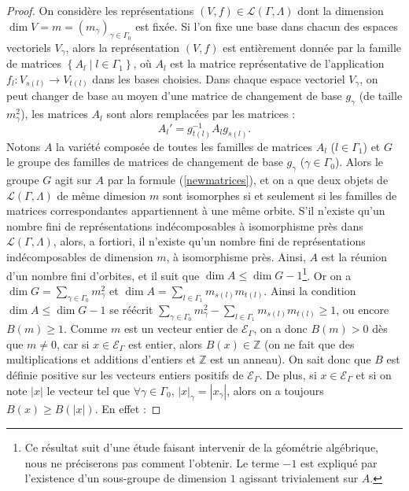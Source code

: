 \documentclass[a4paper,11pt]{article}
\newcommand{\EG}{\mathscr{E}_\Gamma}
\begin{document}
\begin{proof}
	On considère les représentations $(V,f)\in\mathscr L(\Gamma,\Lambda)$ dont la dimension $\dim V=m=(m_\gamma)_{\gamma\in\Gamma_0}$ est fixée. Si l'on fixe une base dans chacun des espaces vectoriels $V_\gamma$, alors la représentation $(V,f)$ est entièrement donnée par la famille de matrices $\left\{ A_l \;|\; l\in\Gamma_1 \right\}$, où $A_l$ est la matrice représentative de l'application $f_l:V_{s(l)}\rightarrow V_{t(l)}$ dans les bases choisies. Dans chaque espace vectoriel $V_\gamma$, on peut changer de base au moyen d'une matrice de changement de base $g_\gamma$ (de taille $m_\gamma^2$), les matrices $A_l$ sont alors remplacées par les matrices :
	\begin{equation}
		A_l'=g_{t(l)}^{-1}A_lg_{s(l)}.
		\label{newmatrices}
	\end{equation}
	Notons $A$ la variété composée de toutes les familles de matrices $A_l$ ($l\in\Gamma_1$) et $G$ le groupe des familles de matrices de changement de base $g_\gamma$ ($\gamma\in\Gamma_0$). Alors le groupe $G$ agit sur $A$ par la formule (\ref{newmatrices}), et on a que deux objets de $\mathscr L(\Gamma,\Lambda)$ de même dimesion $m$ sont isomorphes si et seulement si les familles de matrices correspondantes appartiennent à une même orbite. S'il n'existe qu'un nombre fini de représentations indécomposables à isomorphisme près dans $\mathscr L(\Gamma,\Lambda)$, alors, a fortiori, il n'existe qu'un nombre fini de représentations indécomposables de dimension $m$, à isomorphisme près. Ainsi, $A$ est la réunion d'un nombre fini d'orbites, et il suit que $\dim A\leq\dim G-1$\footnote{Ce résultat suit d'une étude faisant intervenir de la géométrie algébrique, nous ne préciserons pas comment l'obtenir. Le terme $-1$ est expliqué par l'existence d'un sous-groupe de dimension $1$ agissant trivialement sur $A$.}. Or on a $\dim G=\sum_{\gamma\in\Gamma_0}m_\gamma^2$ et $\dim A=\sum_{l\in\Gamma_1}m_{s(l)}m_{t(l)}$. Ainsi la condition $\dim A\leq\dim G-1$ se réécrit $\sum_{\gamma\in\Gamma_0}m_\gamma^2-\sum_{l\in\Gamma_1}m_{s(l)}m_{t(l)}\geq 1$, ou encore $B(m)\geq1$. Comme $m$ est un vecteur entier de $\EG$, on a donc $B(m)>0$ dès que $m\neq0$, car si $x\in\EG$ est entier, alors $B(x)\in\mathbb Z$ (on ne fait que des multiplications et additions d'entiers et $\mathbb Z$ est un anneau). On sait donc que $B$ est définie positive sur les vecteurs entiers positifs de $\EG$. De plus, si $x\in\EG$ et si on note $|x|$ le vecteur tel que $\forall\gamma\in\Gamma_0$, $|x|_\gamma=|x_\gamma|$, alors on a toujours $B(x)\geq B(|x|)$. En effet :

\end{proof}
\end{document}

